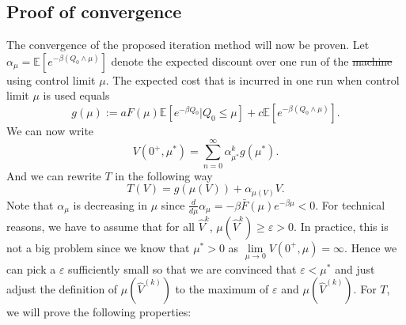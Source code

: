 \documentclass[a4paper]{thesis}
\theoremstyle{definition}
\providecommand{\DIFaddtex}[1]{{\protect\color{blue}\uwave{#1}}} %
\providecommand{\DIFdeltex}[1]{{\protect\color{red}\sout{#1}}}                      %
\providecommand{\DIFaddbegin}{} %
\providecommand{\DIFaddend}{} %
\providecommand{\DIFdelbegin}{} %
\providecommand{\DIFdelend}{} %
\providecommand{\DIFadd}[1]{\texorpdfstring{\DIFaddtex{#1}}{#1}} %
\providecommand{\DIFdel}[1]{\texorpdfstring{\DIFdeltex{#1}}{}} %
\newcommand{\DIFscaledelfig}{0.5}
\newlength{\DIFdelgraphicswidth} %
\newlength{\DIFdelgraphicsheight} %
\newcommand{\DIFaddincludegraphics}[2][]{{\color{blue}\fbox{\DIFOincludegraphics[#1]{#2}}}} %
\newcommand{\DIFdelincludegraphics}[2][]{%
	\sbox{\DIFdelgraphicsbox}{\DIFOincludegraphics[#1]{#2}}%
	\settoboxwidth{\DIFdelgraphicswidth}{\DIFdelgraphicsbox} %
	\settoboxtotalheight{\DIFdelgraphicsheight}{\DIFdelgraphicsbox} %
	\scalebox{\DIFscaledelfig}{%
		\parbox[b]{\DIFdelgraphicswidth}{\usebox{\DIFdelgraphicsbox}\\[-\baselineskip] \rule{\DIFdelgraphicswidth}{0em}}\llap{\resizebox{\DIFdelgraphicswidth}{\DIFdelgraphicsheight}{%
				\setlength{\unitlength}{\DIFdelgraphicswidth}%
				\begin{picture}(1,1)%
				\thicklines\linethickness{2pt} %
				{\color[rgb]{1,0,0}\put(0,0){\framebox(1,1){}}}%
				{\color[rgb]{1,0,0}\put(0,0){\line( 1,1){1}}}%
				{\color[rgb]{1,0,0}\put(0,1){\line(1,-1){1}}}%
				\end{picture}%
			}\hspace*{3pt}}} %
} %
\DeclareRobustCommand{\DIFaddbegin}{\DIFOaddbegin \let\includegraphics\DIFaddincludegraphics} %
\DeclareRobustCommand{\DIFaddend}{\DIFOaddend \let\includegraphics\DIFOincludegraphics} %
\DeclareRobustCommand{\DIFdelbegin}{\DIFOdelbegin \let\includegraphics\DIFdelincludegraphics} %
\DeclareRobustCommand{\DIFdelend}{\DIFOaddend \let\includegraphics\DIFOincludegraphics} %
\begin{document}
	\subsection{Proof of convergence}
	The convergence of the proposed iteration method will now be proven.
	Let $\alpha_\mu=\mathbb{E}[e^{-\beta (Q_0\wedge\mu)}]$ denote the expected discount over one run of the \DIFdelbegin \DIFdel{machine }\DIFdelend \DIFaddbegin \DIFadd{asset }\DIFaddend using control limit $\mu$.
	The expected cost that is incurred in one  run when control limit $\mu$ is used equals
	$$
	g(\mu):=aF(\mu)\mathbb{E}[e^{-\beta Q_0}|Q_0\leq \mu]+c\mathbb{E}[e^{-\beta(Q_0\wedge\mu)}].
	$$
	We can now write
	$$
	V(0^+,\mu^*)=\sum\limits_{n=0}^\infty \alpha_{\mu^*}^kg(\mu^*).
	$$
	And we can rewrite $T$ in the following way
	\[
	T(V)=g(\mu(V))+\alpha_{\mu(V)}V.
	\]
	Note that $\alpha_\mu$ is decreasing in $\mu$ since $\frac{d}{d\mu}\alpha_\mu=-\beta\bar F(\mu)e^{-\beta \mu}<0$.
	For technical reasons, we have to assume that for all $\hat{V}^{k}$, $\mu(\hat{V}^{k})\geq\varepsilon>0$.
	In practice, this is not a big problem since we know that $\mu^*>0$ as $\lim\limits_{\mu\rightarrow 0}V(0^+,\mu)=\infty$.
	Hence we can pick a $\varepsilon$ sufficiently small so that we are convinced that $\varepsilon<\mu^*$ and just adjust the definition of $\mu(\hat{V}^{(k)})$ to the maximum of $\varepsilon$ and $\mu(\hat{V}^{(k)})$.
	For $T$, we will prove the following properties:
\end{document}
